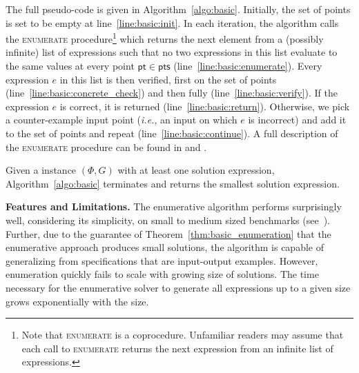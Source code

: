 \documentclass{llncs}
\newcommand\comment[1]{}
\newcommand{\ie}{\emph{i.e.}}
\newcommand\Points{\mathsf{pts}}
\newcommand\Point{\mathsf{pt}}
\newcommand\Expr{e}
\newcommand\Spec{\Phi}
\newcommand\Grammar{G}
\newcommand{\sygus}{{\sffamily\fontsize{8.5}{10}\selectfont
    SyGuS}\xspace}
\renewcommand{\paragraph}[1]{\par\noindent\textbf{#1.}}
\begin{document}
\noindent
The full pseudo-code is given in Algorithm~\ref{algo:basic}.
Initially, the set of points is set to be empty at
line~\ref{line:basic:init}.  In each iteration, the algorithm calls
the \textsc{enumerate} procedure\footnote{Note that \textsc{enumerate} is
a coprocedure.  Unfamiliar readers may assume that each call to \textsc{enumerate}
returns the next expression from an infinite list of
expressions.} which returns the next element from a (possibly infinite)
list of expressions
such that no two expressions in this list evaluate to the same values
at every point $\Point \in \Points$ (line~\ref{line:basic:enumerate}).
Every expression $\Expr$ in this list is then verified, first on the
set of points (line~\ref{line:basic:concrete_check}) and then fully
(line~\ref{line:basic:verify}).  If the expression $\Expr$ is correct,
it is returned (line~\ref{line:basic:return}).  Otherwise, we pick a
counter-example input point (\ie, an input on which $\Expr$ is
incorrect) and add it to the set of points and repeat
(line~\ref{line:basic:continue}). 
A full description of the \textsc{enumerate} procedure can be found in
\cite{udupa-sygus} and \cite{udupa-transit}.

\begin{theorem}
  \label{thm:basic_enumeration}
  Given a {\upshape\sygus} instance $(\Spec, \Grammar)$ with at least one solution
  expression, Algorithm~\ref{algo:basic} terminates and returns the
  smallest solution expression.
\end{theorem}

\comment{
\begin{wrapfigure}{l}{0.5\textwidth}
\centering
\begin{tikzpicture}
\begin{semilogyaxis}[
width=5cm,
height=5cm,
xlabel=Expression Size,
ylabel=Time to enumerate (s),
tick align=outside,
grid=both,
xtick = {2, 4, 6, 8, 10},
ytick = {0.0001, 0.01, 1, 100, 10000, 1000000, 10000000}
]
\addplot[mark=*,color=black] table {enumeration.dat};
\end{semilogyaxis}
\end{tikzpicture}
\caption{Scalability of Enumeration}
\label{figure:random_exponential_graph}
\end{wrapfigure}
}
\paragraph{Features and Limitations}
The enumerative algorithm performs surprisingly well, considering its
simplicity, on small to medium sized benchmarks
(see~\cite{udupa-transit,udupa-sygus}).
Further, due to the guarantee of Theorem~\ref{thm:basic_enumeration}
that the enumerative approach produces small solutions, the algorithm is
capable of generalizing from specifications that are input-output
examples.
%
However, enumeration quickly fails to scale with growing size of
solutions.
The time necessary for the enumerative solver to generate all
expressions up to a given size grows exponentially with the size.
\end{document}
